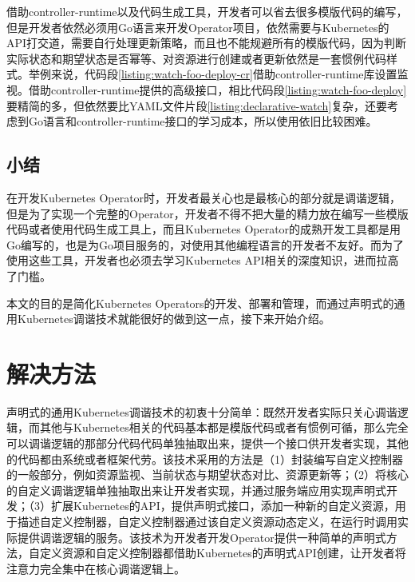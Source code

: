 \documentclass[macfonts,master]{njuthesis}
\begin{document}
借助controller-runtime以及代码生成工具，开发者可以省去很多模版代码的编写，但是开发者依然必须用Go语言来开发Operator项目，依然需要与Kubernetes的API打交道，需要自行处理更新策略，而且也不能规避所有的模版代码，因为判断实际状态和期望状态是否幂等、对资源进行创建或者更新依然是一套惯例代码样式。举例来说，代码段\ref{listing:watch-foo-deploy-cr}借助controller-runtime库设置监视。借助controller-runtime提供的高级接口，相比代码段\ref{listing:watch-foo-deploy}要精简的多，但依然要比YAML文件片段\ref{listing:declarative-watch}复杂，还要考虑到Go语言和controller-runtime接口的学习成本，所以使用依旧比较困难。

\subsection{小结}

在开发Kubernetes Operator时，开发者最关心也是最核心的部分就是调谐逻辑，但是为了实现一个完整的Operator，开发者不得不把大量的精力放在编写一些模版代码或者使用代码生成工具上，而且Kubernetes Operator的成熟开发工具都是用Go编写的，也是为Go项目服务的，对使用其他编程语言的开发者不友好。而为了使用这些工具，开发者也必须去学习Kubernetes API相关的深度知识，进而拉高了门槛。

本文的目的是简化Kubernetes Operators的开发、部署和管理，而通过声明式的通用Kubernetes调谐技术就能很好的做到这一点，接下来开始介绍。


\section{解决方法}

声明式的通用Kubernetes调谐技术的初衷十分简单：既然开发者实际只关心调谐逻辑，而其他与Kubernetes相关的代码基本都是模版代码或者有惯例可循，那么完全可以调谐逻辑的那部分代码代码单独抽取出来，提供一个接口供开发者实现，其他的代码都由系统或者框架代劳。该技术采用的方法是（1）封装编写自定义控制器的一般部分，例如资源监视、当前状态与期望状态对比、资源更新等；（2）将核心的自定义调谐逻辑单独抽取出来让开发者实现，并通过服务端应用实现声明式开发；（3）扩展Kubernetes的API，提供声明式接口，添加一种新的自定义资源，用于描述自定义控制器，自定义控制器通过该自定义资源动态定义，在运行时调用实际提供调谐逻辑的服务。该技术为开发者开发Operator提供一种简单的声明式方法，自定义资源和自定义控制器都借助Kubernetes的声明式API创建，让开发者将注意力完全集中在核心调谐逻辑上。
\end{document}
